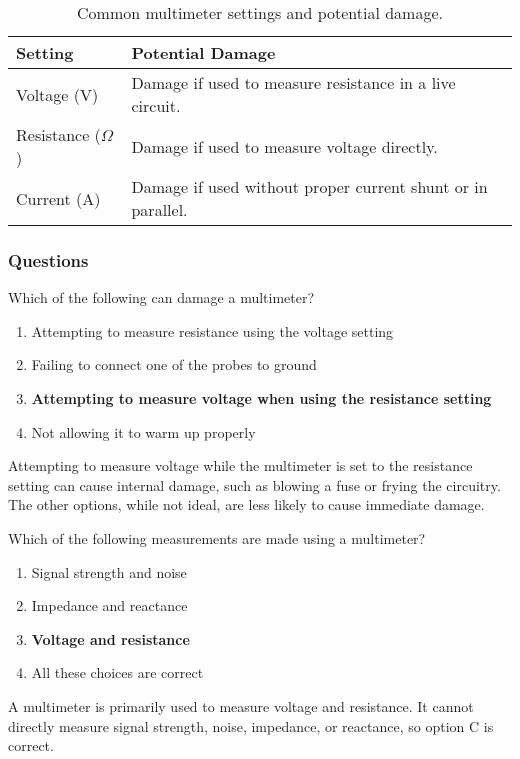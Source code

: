 \begin{table}[h]
    \centering
    \begin{tabular}{|l|l|}
        \hline
        \textbf{Setting} & \textbf{Potential Damage} \\
        \hline
        Voltage (V) & Damage if used to measure resistance in a live circuit. \\
        Resistance ($\Omega$) & Damage if used to measure voltage directly. \\
        Current (A) & Damage if used without proper current shunt or in parallel. \\
        \hline
    \end{tabular}
    \caption{Common multimeter settings and potential damage.}
    \label{tab:multimeter-damage}
\end{table}

\subsubsection{Questions}

\begin{tcolorbox}[colback=gray!10!white,colframe=black!75!black,title={T7D06}]
    Which of the following can damage a multimeter?
    \begin{enumerate}[label=\Alph*),noitemsep]
        \item Attempting to measure resistance using the voltage setting
        \item Failing to connect one of the probes to ground
        \item \textbf{Attempting to measure voltage when using the resistance setting}
        \item Not allowing it to warm up properly
    \end{enumerate}
\end{tcolorbox}

Attempting to measure voltage while the multimeter is set to the resistance setting can cause internal damage, such as blowing a fuse or frying the circuitry. The other options, while not ideal, are less likely to cause immediate damage.

\begin{tcolorbox}[colback=gray!10!white,colframe=black!75!black,title={T7D07}]
    Which of the following measurements are made using a multimeter?
    \begin{enumerate}[label=\Alph*),noitemsep]
        \item Signal strength and noise
        \item Impedance and reactance
        \item \textbf{Voltage and resistance}
        \item All these choices are correct
    \end{enumerate}
\end{tcolorbox}

A multimeter is primarily used to measure voltage and resistance. It cannot directly measure signal strength, noise, impedance, or reactance, so option C is correct.

